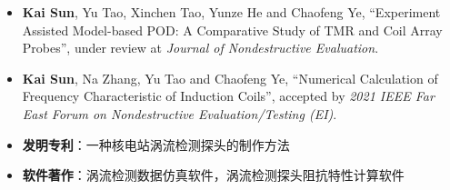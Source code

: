 \begin{itemize}
    \item \textbf{Kai Sun}, Yu Tao, Xinchen Tao, Yunze He and Chaofeng Ye,
          ``Experiment Assisted Model-based POD: A Comparative Study of TMR and Coil Array Probes'',
          under review at \emph{Journal of Nondestructive Evaluation}.\\
          { \footnotesize {}}
    \item \textbf{Kai Sun}, Na Zhang, Yu Tao and Chaofeng Ye,
          ``Numerical Calculation of Frequency Characteristic of Induction Coils'',
          accepted by \emph{2021 IEEE Far East Forum on Nondestructive Evaluation/Testing (EI)}.\\
          { \footnotesize {}}
    \item \textbf{发明专利}：一种核电站涡流检测探头的制作方法
    \item \textbf{软件著作}：涡流检测数据仿真软件，涡流检测探头阻抗特性计算软件
\end{itemize}